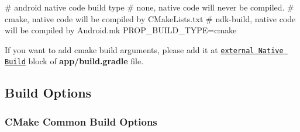 \begin{DoxyCode}
# android native code build type
# none, native code will never be compiled.
# cmake, native code will be compiled by CMakeLists.txt
# ndk-build, native code will be compiled by Android.mk
PROP\_BUILD\_TYPE=cmake
\end{DoxyCode}


If you want to add cmake build arguments, please add it at \href{https://github.com/cocos2d/cocos2d-x/blob/84be684e3858393a6f3efc50e3f95d4e0ac92a20/tests/cpp-empty-test/proj.android/app/build.gradle#L25}{\tt external Native Build} block of {\bfseries app/build.\+gradle} file.

\subsection*{Build Options}

\subsubsection*{C\+Make Common Build Options}



